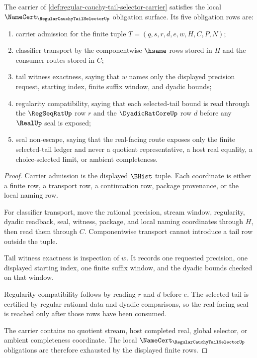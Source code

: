 \begin{theorem}
\label{thm:regular-cauchy-tail-selector-namecert-obligations}
\label{thm:reg-cauchy-tail-sel-namecert-obligations}
The carrier of \autoref{def:regular-cauchy-tail-selector-carrier} satisfies the local $\NameCert_{\RegularCauchyTailSelectorUp}$ obligation surface. Its five obligation rows are:
\begin{enumerate}
\item carrier admission for the finite tuple $T=(q,s,r,d,e,w,H,C,P,N)$;
\item classifier transport by the componentwise $\hsame$ rows stored in $H$ and the consumer routes stored in $C$;
\item tail witness exactness, saying that $w$ names only the displayed precision request, starting index, finite suffix window, and dyadic bounds;
\item regularity compatibility, saying that each selected-tail bound is read through the $\RegSeqRatUp$ row $r$ and the $\DyadicRatCoreUp$ row $d$ before any $\RealUp$ seal is exposed;
\item seal non-escape, saying that the real-facing route exposes only the finite selected-tail ledger and never a quotient representative, a host real equality, a choice-selected limit, or ambient completeness.
\end{enumerate}
\end{theorem}
\begin{proof}
Carrier admission is the displayed $\BHist$ tuple. Each coordinate is either a finite row, a transport row, a continuation row, package provenance, or the local naming row.

For classifier transport, move the rational precision, stream window, regularity, dyadic readback, seal, witness, package, and local naming coordinates through $H$, then read them through $C$. Componentwise transport cannot introduce a tail row outside the tuple.

Tail witness exactness is inspection of $w$. It records one requested precision, one displayed starting index, one finite suffix window, and the dyadic bounds checked on that window.

Regularity compatibility follows by reading $r$ and $d$ before $e$. The selected tail is certified by regular rational data and dyadic comparisons, so the real-facing seal is reached only after those rows have been consumed.

The carrier contains no quotient stream, host completed real, global selector, or ambient completeness coordinate. The local $\NameCert_{\RegularCauchyTailSelectorUp}$ obligations are therefore exhausted by the displayed finite rows.
\end{proof}

